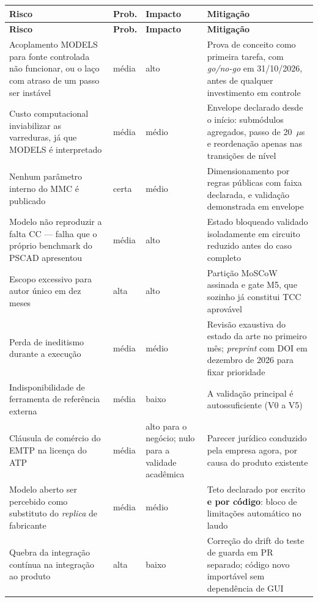 \documentclass[12pt,a4paper]{article}
\begin{document}
{\footnotesize
\begin{xltabular}{\textwidth}{@{}p{4.4cm}p{1.1cm}p{1.9cm}X@{}}
\toprule
\textbf{Risco} & \textbf{Prob.} & \textbf{Impacto} & \textbf{Mitigação} \\
\midrule
\endfirsthead
\toprule
\textbf{Risco} & \textbf{Prob.} & \textbf{Impacto} & \textbf{Mitigação} \\
\midrule
\endhead
\bottomrule
\endfoot
Acoplamento MODELS para fonte controlada não funcionar, ou o laço com atraso de um passo ser instável
& média & alto &
Prova de conceito como primeira tarefa, com \emph{go/no-go} em 31/10/2026, antes de qualquer
investimento em controle \\
Custo computacional inviabilizar as varreduras, já que MODELS é interpretado
& média & médio &
Envelope declarado desde o início: submódulos agregados, passo de 20~$\mu$s e reordenação apenas nas
transições de nível \\
Nenhum parâmetro interno do MMC é publicado
& certa & médio &
Dimensionamento por regras públicas com faixa declarada, e validação demonstrada em envelope \\
Modelo não reproduzir a falta CC --- falha que o próprio benchmark do PSCAD apresentou
& média & alto &
Estado bloqueado validado isoladamente em circuito reduzido antes do caso completo \\
Escopo excessivo para autor único em dez meses
& alta & alto &
Partição MoSCoW assinada e gate M5, que sozinho já constitui TCC aprovável \\
Perda de ineditismo durante a execução
& média & médio &
Revisão exaustiva do estado da arte no primeiro mês; \emph{preprint} com DOI em dezembro de 2026
para fixar prioridade \\
Indisponibilidade de ferramenta de referência externa
& média & baixo &
A validação principal é autossuficiente (V0 a V5) \\
Cláusula de comércio do EMTP na licença do ATP
& média & alto para o negócio; nulo para a validade acadêmica &
Parecer jurídico conduzido pela empresa agora, por causa do produto existente \\
Modelo aberto ser percebido como substituto do \emph{replica} de fabricante
& média & médio &
Teto declarado por escrito \textbf{e por código}: bloco de limitações automático no laudo \\
Quebra da integração contínua na integração ao produto
& alta & baixo &
Correção do drift do teste de guarda em PR separado; código novo importável sem dependência de GUI \\
\end{xltabular}}
\end{document}
